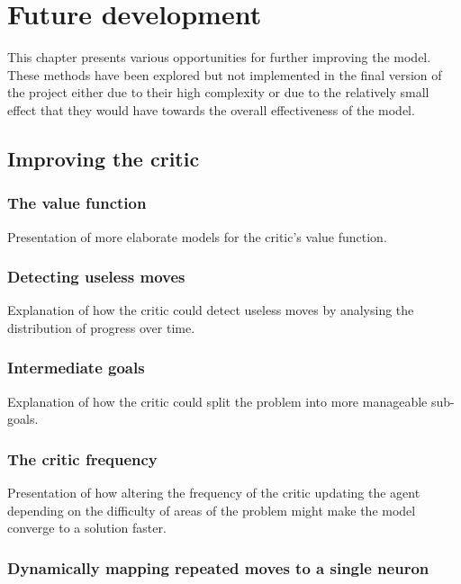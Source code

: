 \documentclass[10pt]{article}
\begin{document}
    \section{Future development}

    This chapter presents various opportunities for further improving the model. These methods have been explored but not implemented in the final version of the project either due to their high complexity or due to the relatively small effect that they would have towards the overall effectiveness of the model.

    \subsection{Improving the critic}

    \subsubsection{The value function}

    Presentation of more elaborate models for the critic's value function.

    \subsubsection{Detecting useless moves}

    Explanation of how the critic could detect useless moves by analysing the distribution of progress over time.

    \subsubsection{Intermediate goals}

    Explanation of how the critic could split the problem into more manageable sub-goals.

    \subsubsection{The critic frequency}

    Presentation of how altering the frequency of the critic updating the agent depending on the difficulty of areas of the problem might make the model converge to a solution faster.

    \subsubsection{Dynamically mapping repeated moves to a single neuron}
\end{document}
